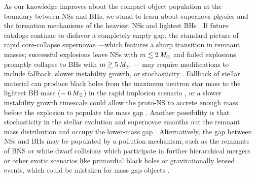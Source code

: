 As our knowledge improves about the compact object population at the boundary between \acp{NS} and \acp{BH}, we stand to learn about supernova physics \citep[e.g.,][]{Burrows:2020qrp} and the formation mechanisms of the heaviest \acp{NS} and lightest \acp{BH} \citep[][and references therein]{LIGOScientific:2024elc}.
If future catalogs continue to disfavor a completely empty gap, the standard picture of rapid core-collapse supernovae
---which features a sharp transition in remnant masses; successful explosions leave \acp{NS} with $m\lesssim 2\,\mathit{M_\odot}$ and failed explosions promptly collapse to \acp{BH} with $m\gtrsim 5\,\mathit{M_\odot}$ \citep[e.g.,][]{Fryer:1999ht,Fryer:2011cx}---
may require modifications to include fallback, slower instability growth, or stochasticity \citep[e.g.,][]{Fryer:1999ht,Fryer:2011cx,Belczynski:2011bn,Sukhbold:2015wba,Ertl:2019zks,Mandel:2020qwb}.
Fallback of stellar material can produce black holes from the maximum neutron star mass to the lightest \ac{BH} mass ($\sim 6\,\mathit{M_\odot}$) in the rapid implosion scenario \citep[e.g.,][]{Ertl:2019zks}, or
a slower instability growth timescale could allow the proto-\ac{NS} to accrete enough mass before the explosion to populate the mass gap \citep[e.g.,][]{Belczynski:2011bn,Olejak:2022zee,Fryer:2022lla}.
Another possibility is that stochasticity in the stellar evolution and supernovae smooths out the remnant mass distribution and occupy the lower-mass gap \citep[e.g.,][]{Mandel:2020qwb,Mandel:2020cig}.
Alternatively, the gap between \acp{NS} and \acp{BH} may be populated by a pollution mechanism, such as the remnants of \ac{BNS} or white dwarf collisions which participate in further hierarchical mergers \citep[e.g.,][]{Gupta:2019nwj, Ye:2019xvf, Ye:2024wqj, Barr:2024wwl, Mahapatra:2025agb} or other exotic scenarios like primordial black holes \citep[e.g.,][]{Clesse:2020ghq} or gravitationally lensed events, which could be mistaken for mass gap objects \citep[e.g.,][]{Bianconi:2022etr,Janquart:2024ztv,Farah:2025ews}.
